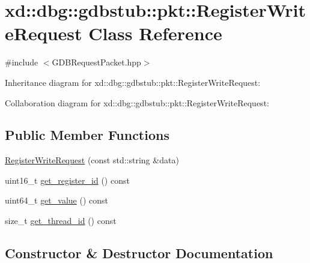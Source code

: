 \hypertarget{classxd_1_1dbg_1_1gdbstub_1_1pkt_1_1_register_write_request}{}\section{xd\+:\+:dbg\+:\+:gdbstub\+:\+:pkt\+:\+:Register\+Write\+Request Class Reference}
\label{classxd_1_1dbg_1_1gdbstub_1_1pkt_1_1_register_write_request}


{\ttfamily \#include $<$G\+D\+B\+Request\+Packet.\+hpp$>$}



Inheritance diagram for xd\+:\+:dbg\+:\+:gdbstub\+:\+:pkt\+:\+:Register\+Write\+Request\+:


Collaboration diagram for xd\+:\+:dbg\+:\+:gdbstub\+:\+:pkt\+:\+:Register\+Write\+Request\+:
\subsection*{Public Member Functions}
\begin{DoxyCompactItemize}
\item 
\mbox{\hyperlink{classxd_1_1dbg_1_1gdbstub_1_1pkt_1_1_register_write_request_af02933a75760f415bc7a0bea5d28059a}{Register\+Write\+Request}} (const std\+::string \&data)
\item 
uint16\+\_\+t \mbox{\hyperlink{classxd_1_1dbg_1_1gdbstub_1_1pkt_1_1_register_write_request_a106c0ba9aa2e62f3e367288d9841639d}{get\+\_\+register\+\_\+id}} () const
\item 
uint64\+\_\+t \mbox{\hyperlink{classxd_1_1dbg_1_1gdbstub_1_1pkt_1_1_register_write_request_ad57b08c5a4b6006fd447261453d72135}{get\+\_\+value}} () const
\item 
size\+\_\+t \mbox{\hyperlink{classxd_1_1dbg_1_1gdbstub_1_1pkt_1_1_register_write_request_afba26ca9bc00397f8f0c042eb495a644}{get\+\_\+thread\+\_\+id}} () const
\end{DoxyCompactItemize}


\subsection{Constructor \& Destructor Documentation}
\mbox{\label{classxd_1_1dbg_1_1gdbstub_1_1pkt_1_1_register_write_request_af02933a75760f415bc7a0bea5d28059a}} 
